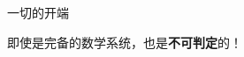 \documentclass{myslide}
\begin{document}
\begin{frame}{一切的开端}
\begin{itemize}
{\begin{figure}
\end{figure}
\begin{center}
\large 即使是完备的数学系统，也是\textbf{不可判定}的！
\end{center}
}
\end{itemize}
\end{frame}

\begin{frame}
\end{frame}

\end{document}
